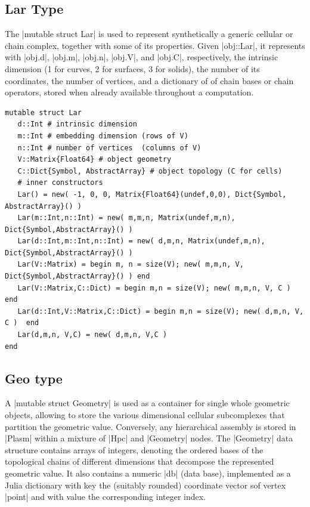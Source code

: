 \subsection*{Lar Type}\label{sect:4-1-2}

The |mutable struct Lar| is used to represent synthetically a generic cellular or chain complex, together with some of its properties. Given |obj::Lar|, it represents with |obj.d|, |obj.m|, |obj.n|, |obj.V|, and |obj.C|, respectively, the intrinsic dimension (1 for curves, 2 for surfaces, 3 for solids), the number of its coordinates, the number of vertices, and a dictionary of of chain bases or chain operators, stored when already available throughout a computation.

\begin{lstlisting}[language=JuliaLocal, style=julia, mathescape = true] 
mutable struct Lar
   d::Int # intrinsic dimension
   m::Int # embedding dimension (rows of V)
   n::Int # number of vertices  (columns of V)
   V::Matrix{Float64} # object geometry
   C::Dict{Symbol, AbstractArray} # object topology (C for cells) 
   # inner constructors
   Lar() = new( -1, 0, 0, Matrix{Float64}(undef,0,0), Dict{Symbol, AbstractArray}() )
   Lar(m::Int,n::Int) = new( m,m,n, Matrix(undef,m,n), Dict{Symbol,AbstractArray}() )
   Lar(d::Int,m::Int,n::Int) = new( d,m,n, Matrix(undef,m,n), Dict{Symbol,AbstractArray}() ) 
   Lar(V::Matrix) = begin m, n = size(V); new( m,m,n, V, Dict{Symbol,AbstractArray}() ) end
   Lar(V::Matrix,C::Dict) = begin m,n = size(V); new( m,m,n, V, C )  end
   Lar(d::Int,V::Matrix,C::Dict) = begin m,n = size(V); new( d,m,n, V, C )  end
   Lar(d,m,n, V,C) = new( d,m,n, V,C )
end
\end{lstlisting}



\subsection*{Geo type}\label{sect:4-1-3}

A |mutable struct Geometry| is used as a container for single whole geometric objects, allowing to store the various dimensional cellular subcomplexes that partition the geometric value. Conversely, any hierarchical assembly is stored in |Plasm| within a mixture of |Hpc| and |Geometry| nodes. The |Geometry| data structure contains arrays of integers, denoting the ordered bases of the topological chains of different dimensions that decompose the represented geometric value. It also contains a numeric |db| (data base), implemented as a Julia dictionary with key the (suitably rounded) coordinate vector sof vertex |point| and with value the corresponding integer index.

